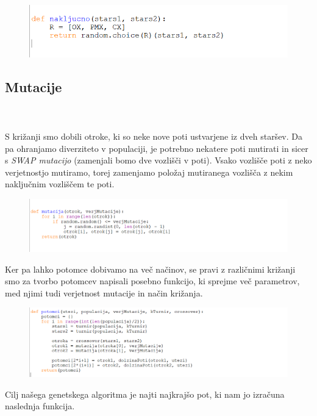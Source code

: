 \documentclass[12pt,a4paper]{amsart}
\theoremstyle{definition} %
\theoremstyle{plain} %
\begin{document}
\begin{figure}[ht]
\centering
\includegraphics[width=1\textwidth]{nakljucno}
\end{figure}

\newpage
\subsection{Mutacije}
\
\\
\\
S križanji smo dobili otroke, ki so neke nove poti ustvarjene iz dveh staršev. Da pa ohranjamo diverziteto v populaciji, je potrebno nekatere poti mutirati in sicer s \textit{SWAP mutacijo} (zamenjali bomo dve vozlišči v poti). Vsako vozlišče poti z neko verjetnostjo mutiramo, torej zamenjamo položaj mutiranega vozlišča z nekim naključnim vozliščem te poti. 
\begin{figure}[ht]
\centering
\includegraphics[width=1\textwidth]{mutacija}
\end{figure}

Ker pa lahko potomce dobivamo na več načinov, se pravi z različnimi križanji smo za tvorbo potomcev napisali posebno funkcijo, ki sprejme več parametrov, med njimi tudi verjetnost mutacije in način križanja. 

\begin{figure}[ht]
\centering
\includegraphics[width=1\textwidth]{potomci}
\end{figure}
Cilj našega genetskega algoritma je najti najkrajšo pot, ki nam jo izračuna naslednja funkcija. 
\end{document}
